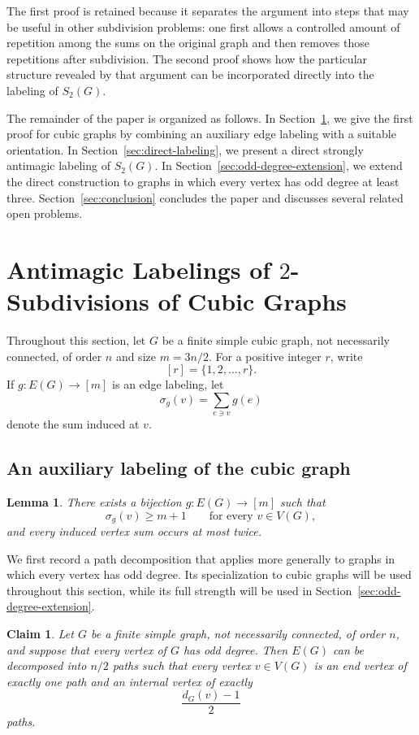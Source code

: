 \documentclass[preprint,12pt]{elsarticle}
\newtheorem{lemma}[theorem]{Lemma}
\newtheorem{claim}{Claim}[section]
\begin{document}
The first proof is retained because it separates the argument into steps
that may be useful in other subdivision problems: one first allows a
controlled amount of repetition among the sums on the original graph and
then removes those repetitions after subdivision. The second proof shows
how the particular structure revealed by that argument can be
incorporated directly into the labeling of \(S_2(G)\).

The remainder of the paper is organized as follows. In
Section~\ref{sec:main-results}, we give the first proof for cubic graphs by
combining an auxiliary edge labeling with a suitable orientation. In
Section~\ref{sec:direct-labeling}, we present a direct strongly antimagic
labeling of \(S_2(G)\). In Section~\ref{sec:odd-degree-extension}, we
extend the direct construction to graphs in which every vertex has odd
degree at least three. Section~\ref{sec:conclusion} concludes the paper
and discusses several related open problems.


\section{Antimagic Labelings of \(2\)-Subdivisions of Cubic Graphs}
\label{sec:main-results}

Throughout this section, let \(G\) be a finite simple cubic graph, not
necessarily connected, of order \(n\) and size \(m=3n/2\). For a positive
integer \(r\), write
\[
[r]=\{1,2,\ldots,r\}.
\]
If \(g:E(G)\to[m]\) is an edge labeling, let
\[
\sigma_g(v)=\sum_{e\ni v}g(e)
\]
denote the sum induced at \(v\).

\subsection{An auxiliary labeling of the cubic graph}
\label{subsec:auxiliary-labeling}

\begin{lemma}
\label{lem:auxiliary-labeling}
There exists a bijection \(g:E(G)\to[m]\) such that
\[
\sigma_g(v)\ge m+1
\qquad\text{for every }v\in V(G),
\]
and every induced vertex sum occurs at most twice.
\end{lemma}

We first record a path decomposition that applies more generally to graphs
in which every vertex has odd degree. Its specialization to cubic graphs
will be used throughout this section, while its full strength will be used
in Section~\ref{sec:odd-degree-extension}.

\begin{claim}
\label{clm:path-decomposition}
Let \(G\) be a finite simple graph, not necessarily connected, of order
\(n\), and suppose that every vertex of \(G\) has odd degree. Then \(E(G)\)
can be decomposed into \(n/2\) paths such that every vertex \(v\in V(G)\)
is an end vertex of exactly one path and an internal vertex of exactly
\[
\frac{d_G(v)-1}{2}
\]
paths.
\end{claim}
\end{document}
